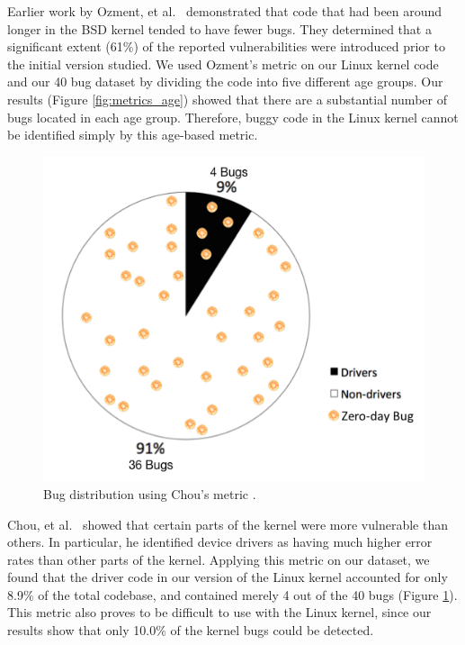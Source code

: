 Earlier work by Ozment, et al.~\cite{ozment2006milk} demonstrated that code that
had been around longer in the BSD kernel tended to have fewer bugs.
They determined that a significant extent (61\%) of the reported
vulnerabilities were
introduced prior to the initial version studied.
We used Ozment's metric on our Linux kernel code and our 40 bug dataset
by dividing the code into five different age groups.
Our results (Figure \ref{fig:metrics_age}) showed that there are a substantial
number of bugs located in each age group.
Therefore, buggy code in the Linux kernel cannot be identified simply
by this age-based metric. 


\begin{figure}
\centering
\includegraphics[width=0.9\columnwidth]{diagram/metrics_drivers.png}
\caption{\small Bug distribution using Chou's metric \cite{PittSFIeld}.}
\label{fig:metrics_drivers}
\end{figure}

Chou, et al.~\cite{PittSFIeld} showed that certain parts of the kernel
were more vulnerable than others. In particular, he identified device drivers as
having much higher error rates than other parts of the kernel.
Applying this metric on our dataset, we found that the driver code in our version
of the Linux kernel accounted for only 8.9\% of the total codebase, and contained
merely 4 out of the 40 bugs (Figure \ref{fig:metrics_drivers}).
This metric also proves to be difficult to use with the
Linux kernel, since our results show that
only 10.0\% of the kernel bugs could be detected.

